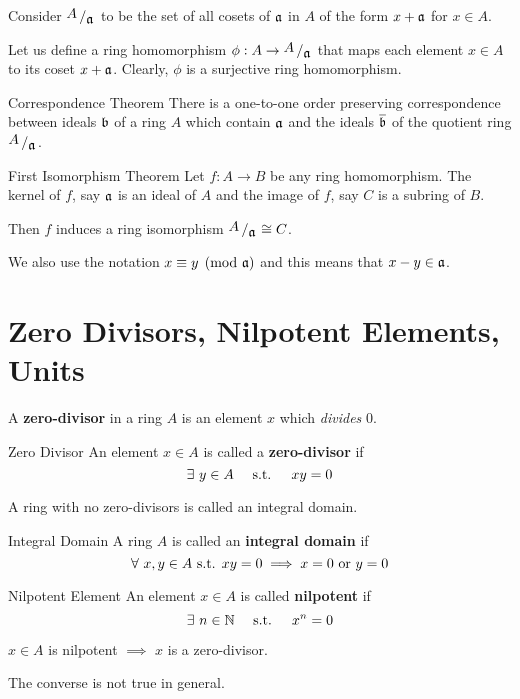 Consider \( \bigslant{A}{\mfa} \) to be the set of all cosets of
\( \mathfrak{a} \) in \( A \) of the form \( x + \mathfrak{a} \) for \( x \in A \).

Let us define a ring homomorphism \( \phi: A \to \bigslant{A}{\mfa} \)
that maps each element \( x \in A \) to its coset \( x + \mathfrak{a} \).
Clearly, \( \phi \) is a surjective ring homomorphism.

\begin{theorem}{Correspondence Theorem}{}
	There is a one-to-one order preserving correspondence between
	ideals \( \mathfrak{b} \) of a ring \( A \) which contain \( \mathfrak{a} \)
	and the ideals \( \overline{\mathfrak{b}} \) of the quotient ring
	\( \bigslant{A}{\mfa} \).
\end{theorem}

\begin{theorem}{First Isomorphism Theorem}{}
	Let \( f: A \to B \) be any ring homomorphism.
	The kernel of \( f \), say \( \mathfrak{a} \) is an ideal of \( A \) and
	the image of \( f \), say \( C \) is a subring of \( B \).

	Then \( f \) induces a ring isomorphism \( \bigslant{A}{\mfa} \cong C \).
\end{theorem}

We also use the notation \( x \equiv y \pmod {\mathfrak{a}} \) and this means that
\( x - y \in \mathfrak{a} \).


\section{Zero Divisors, Nilpotent Elements, Units}
A \textbf{zero-divisor} in a ring \( A \) is an element \( x \)
which \textit{divides} 0.
\begin{defn}{Zero Divisor}{}
	An element \( x \in A \) is called a \textbf{zero-divisor} if
	\[
		\exists\ y \in A \quad \text{ s.t. } \quad xy = 0
	\]
\end{defn}

A ring with no zero-divisors is called an integral domain.
\begin{defn}{Integral Domain}{}
	A ring \( A \) is called an \textbf{integral domain} if
	\[
		\forall\ x, y \in A \text{ s.t. } xy = 0 \implies x = 0 \text{ or } y = 0
	\]
\end{defn}

\begin{defn}{Nilpotent Element}{}
	An element \( x \in A \) is called \textbf{nilpotent} if
	\[
		\exists\ n \in \NN \qstq x^n = 0
	\]
\end{defn}

\begin{note}{}{}
	\( x \in A \) is nilpotent \( \implies \) \( x \) is a zero-divisor.

	The converse is not true in general.
\end{note}

